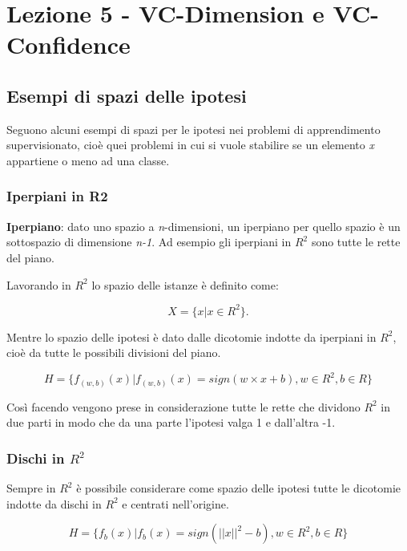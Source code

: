 \section{Lezione 5 - VC-Dimension e VC-Confidence}\label{lezione-5-vc-dimension-e-vc-confidence}

\subsection{Esempi di spazi delle ipotesi}\label{esempi-di-spazi-delle-ipotesi}

Seguono alcuni esempi di spazi per le ipotesi nei problemi di
apprendimento supervisionato, cioè quei problemi in cui si vuole
stabilire se un elemento \emph{x} appartiene o meno ad una classe.

\subsubsection{Iperpiani in R2}\label{iperpiani-in-r2}

\textbf{Iperpiano}: dato uno spazio a \emph{n}-dimensioni, un iperpiano
per quello spazio è un sottospazio di dimensione \emph{n-1}. Ad esempio gli
iperpiani in $R^2$ sono tutte le rette del piano.

Lavorando in $R^2$ lo spazio delle istanze è definito come:

$$
X = \{x | x \in R^2\}.
$$

Mentre lo spazio delle ipotesi è dato dalle dicotomie indotte da iperpiani in $R^2$, cioè da tutte le possibili divisioni del piano.

$$
H = \{f_{(w,b)}(x) | f_{(w,b)}(x) = sign(w \times x + b), w \in R^2, b \in R\}
$$

Così facendo vengono prese in considerazione tutte le rette che dividono
$R^2$ in due parti in modo che da una parte l'ipotesi valga 1 e dall'altra
-1.

\subsubsection{Dischi in $R^2$}\label{dischi-in-r2}

Sempre in $R^2$ è possibile considerare come spazio delle ipotesi tutte le
dicotomie indotte da dischi in $R^2$ e centrati nell'origine.

$$
H = \{f_b(x) | f_b(x) = sign(||x||^2 - b), w \in R^2, b \in R\}
$$

